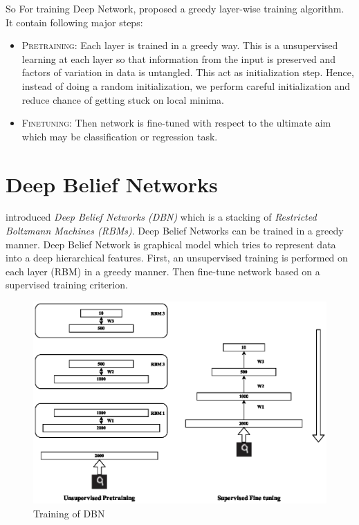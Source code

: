 So For training Deep Network, \citet{hinton2006reducing} proposed a greedy layer-wise training algorithm. It contain following major steps:
\begin{itemize}
\item \textsc{Pretraining}: Each layer is trained in a greedy way. This is a unsupervised learning at each layer so that information from the input is preserved and factors of variation in data is untangled. This act as initialization step. Hence, instead of doing a random initialization, we perform careful initialization and reduce chance of getting stuck on local minima.
\item \textsc{Finetuning}: Then network is fine-tuned with respect to the ultimate aim which may be classification or regression task.
\end{itemize}

\section{Deep Belief Networks}
\citet{hinton2006reducing} introduced  \emph{Deep Belief Networks (DBN)} which is a stacking of \emph{Restricted Boltzmann Machines (RBMs)}. Deep Belief Networks can be trained in a greedy manner\cite{hinton2006reducing}. Deep Belief Network is graphical model which tries to represent data into a deep hierarchical features. First, an unsupervised training is performed on each layer (RBM) in a greedy manner. Then fine-tune network based on a supervised training criterion.
\begin{figure}[!ht]
\includegraphics[scale=1]{./imgs/RBM_Train.eps} 
\caption{Training of DBN}
\end{figure}

